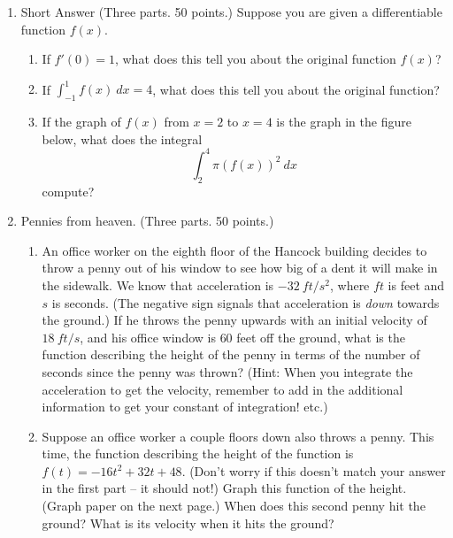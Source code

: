 \documentclass[10pt]{amsart}
\begin{document}
\begin{enumerate}

\begin{center}
{\sc Calculus}
\end{center}


\item  {\sc Short Answer} (Three parts.  50 points.) Suppose you are
given a differentiable function $f(x)$. 
\begin{enumerate}
\item If $f'(0)=1$, what does this tell you about the original
function $f(x)$?
\vfill
\item If $\int_{-1}^1f(x)\ dx=4$, what does this tell you about the
original function?
\vfill
\item If the graph of $f(x)$ from $x=2$ to $x=4$ is the graph in the
figure below, what does the integral
$$
\int_2^4\pi(f(x))^2\ dx
$$
compute?

\begin{figure}[h]
\end{figure}
\end{enumerate}
\pagebreak

\item {\sc Pennies from heaven.}  (Three parts.  50 points.)
\begin{enumerate}
\item An office worker on the eighth floor
of the Hancock building decides to throw a penny out of his window to
see how big of a dent it will make in the sidewalk.  We know that
acceleration is $-32\ ft/s^2$, where $ft$ is feet and $s$ is seconds.
(The negative sign signals that acceleration is {\em down} towards the 
ground.)  If he throws the penny upwards with an initial velocity of
$18\ ft/s$, and his office window is $60$ feet off the ground, what is
the function describing the height of the penny in terms of the number 
of seconds since the penny was thrown? ({\sc Hint:} When you integrate
the acceleration to get the velocity, remember to add in the
additional information to get your constant of integration! etc.)
\vfill
\item Suppose an office worker a couple floors down also throws a 
penny.  This
time, the function describing the height of the function is
$f(t)=-16t^2+32t+48$.  (Don't worry if this doesn't match your answer 
in the first part -- it should not!) Graph this function of the
height.  (Graph paper on the next page.) When does
this second penny hit the ground?  What is its velocity when it hits the
ground?



\end{enumerate}
\end{enumerate}
\end{document}
